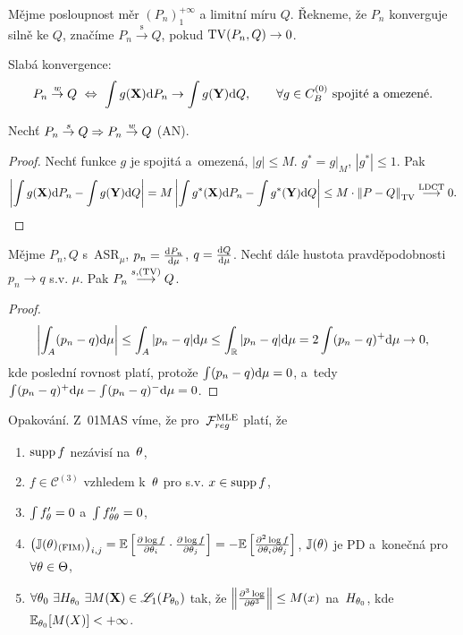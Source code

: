 \begin{define}
	Mějme posloupnost měr $(P_n)_1^{+\infty}$ a limitní míru $Q$. Řekneme, že $P_n$ konverguje silně ke $Q$, značíme $P_n\stackrel{\text{s}}{\rightarrow}Q$, pokud $\mathrm{TV}(P_n,Q)\to0$.
\end{define}
\begin{remark}{Slabá konvergence:}
	$$ P_n\stackrel{w}{\to} Q~\Leftrightarrow~\int g(\textbf{X})\mathrm{d} P_n\to\int g(\textbf{Y})\mathrm{d} Q,\qquad \forall g\in C_B^{(0)}\text{ spojité a~omezené.}$$
\end{remark}
\begin{theorem}
	Nechť $P_n\stackrel{s}{\to}Q\Rightarrow P_n\stackrel{w}{\to} Q$ (AN).
\end{theorem}
\begin{proof}
	 Nechť funkce $g$ je spojitá a~omezená, $|g|\leq M$. $g^\ast =g|_M$, $|g^\ast|\leq 1$. Pak
	$$ \left| \int g(\textbf{X})\mathrm{d} P_n-\int g(\textbf{Y})\mathrm{d} Q \right|=M\left| \int g^\ast(\textbf{X})\mathrm{d} P_n-\int g^\ast(\textbf{Y})\mathrm{d} Q \right|\leq M\cdot \left\| P-Q\right\|_{\mathrm{TV}} \stackrel{\text{LDCT}}{\longrightarrow} 0.$$
\end{proof}
\begin{theorem}
	Mějme $P_n,Q$ s~ASR$_\mu$, $p_n=\frac{\mathrm{d} P_n}{\mathrm{d} \mu}$, $q=\frac{\mathrm{d} Q}{\mathrm{d} \mu}$. Nechť dále hustota pravděpodobnosti $p_n\to q$ s.v. $\mu$. Pak $P_n\stackrel{s,(\mathrm{TV})}{\longrightarrow}Q$. 
	\begin{proof}
		$$ \left| \int_A (p_n-q)\mathrm{d}\mu \right|\leq \int_A|p_n-q|\mathrm{d}\mu\leq \int_{\mathbb{R}}|p_n-q|\mathrm{d}\mu=2\int(p_n-q)^+\mathrm{d}\mu\to0,$$
		kde poslední rovnost platí, protože $\int(p_n-q)\mathrm{d}\mu=0$, a~tedy $\int(p_n-q)^+\mathrm{d}\mu-\int(p_n-q)^-\mathrm{d}\mu=0$.	\end{proof}
\end{theorem}
\begin{remark}
	Opakování. Z~01MAS víme, že pro~$\mathcal{F}_{reg}^{\mathrm{{\footnotesize MLE }}}$ platí, že \begin{enumerate}[1)]
		\item $\mathop{\mathrm{supp}} f$ nezávisí na~$\theta$,
		\item $f\in\mathcal{C}^{(3)}$ vzhledem k~$\theta$ pro s.v. $x\in\mathop{\mathrm{supp}} f$,
		\item $\int f_\theta'=0$ a~$\int f_{\theta\theta}''=0$,
		\item $\left( \mathbb{J}(\theta)_{(\text{FIM})} \right)_{i,j}=\mathbb{E}\left[ \frac{\partial\log f}{\partial \theta_i}\cdot\frac{\partial\log f}{\partial \theta_j} \right]=-\mathbb{E}\left[ \frac{\partial^2 \log f}{\partial\theta_i \partial \theta_j} \right]$, $\mathbb{J}(\theta)$ je PD a~konečná pro~$\forall\theta\in\Theta$,
		\item $\forall\theta_0~\exists H_{\theta_0}~\exists M(\textbf{X})\in\mathscr{L}_1(P_{\theta_0})$ tak, že $\left\| \frac{\partial^3\log }{\partial \theta^3}\right\|\leq M(x)$ na~$H_{\theta_0}$, kde $\mathbb{E}_{\theta_0}[M(X)]<+\infty$.
	\end{enumerate}
\end{remark}
